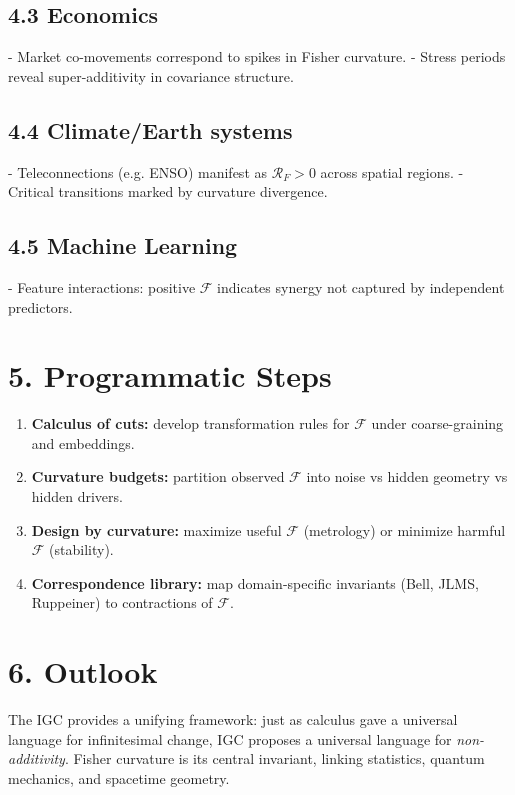 \documentclass[12pt]{article}
\begin{document}
\subsection*{4.3 Economics}
- Market co-movements correspond to spikes in Fisher curvature.
- Stress periods reveal super-additivity in covariance structure.

\subsection*{4.4 Climate/Earth systems}
- Teleconnections (e.g. ENSO) manifest as $\mathcal R_F > 0$ across spatial regions.
- Critical transitions marked by curvature divergence.

\subsection*{4.5 Machine Learning}
- Feature interactions: positive $\mathcal F$ indicates synergy not captured by independent predictors.

\section*{5. Programmatic Steps}
\begin{enumerate}[label=Step \arabic*.]
    \item \textbf{Calculus of cuts:} develop transformation rules for $\mathcal F$ under coarse-graining and embeddings.
    \item \textbf{Curvature budgets:} partition observed $\mathcal F$ into noise vs hidden geometry vs hidden drivers.
    \item \textbf{Design by curvature:} maximize useful $\mathcal F$ (metrology) or minimize harmful $\mathcal F$ (stability).
    \item \textbf{Correspondence library:} map domain-specific invariants (Bell, JLMS, Ruppeiner) to contractions of $\mathcal F$.
\end{enumerate}

\section*{6. Outlook}
The IGC provides a unifying framework: just as calculus gave a universal language for infinitesimal change, IGC proposes a universal language for \emph{non-additivity}. Fisher curvature is its central invariant, linking statistics, quantum mechanics, and spacetime geometry.
\end{document}
